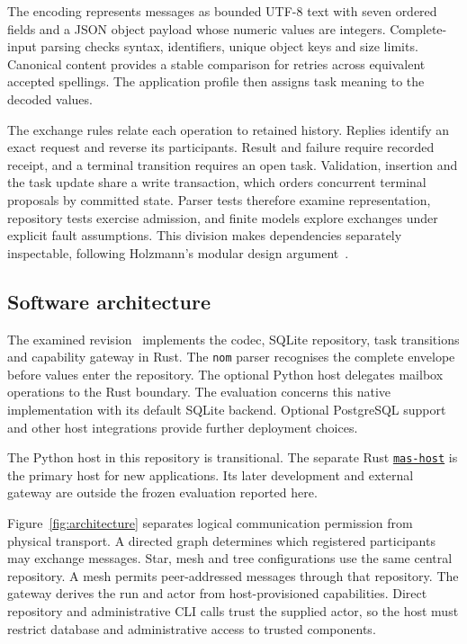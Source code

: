 \documentclass[preprint,12pt,a4paper]{elsarticle}
\newcommand{\code}[1]{\texttt{#1}}
\begin{document}
The encoding represents messages as bounded UTF-8 text with seven ordered fields and a JSON object payload whose numeric values are integers. Complete-input parsing checks syntax, identifiers, unique object keys and size limits. Canonical content provides a stable comparison for retries across equivalent accepted spellings. The application profile then assigns task meaning to the decoded values.

The exchange rules relate each operation to retained history. Replies identify an exact request and reverse its participants. Result and failure require recorded receipt, and a terminal transition requires an open task. Validation, insertion and the task update share a write transaction, which orders concurrent terminal proposals by committed state. Parser tests therefore examine representation, repository tests exercise admission, and finite models explore exchanges under explicit fault assumptions. This division makes dependencies separately inspectable, following Holzmann's modular design argument~\citep[Section~2.7, pp.~36--37]{holzmann1991}.

\subsection{Software architecture}
The examined revision~\citep{masSoftware} implements the codec, SQLite repository, task transitions and capability gateway in Rust. The \code{nom} parser recognises the complete envelope before values enter the repository. The optional Python host delegates mailbox operations to the Rust boundary. The evaluation concerns this native implementation with its default SQLite backend. Optional PostgreSQL support and other host integrations provide further deployment choices.

The Python host in this repository is transitional. The separate Rust \href{https://github.com/emmett08/mas-host}{\code{mas-host}} is the primary host for new applications. Its later development and external gateway are outside the frozen evaluation reported here.

Figure~\ref{fig:architecture} separates logical communication permission from physical transport. A directed graph determines which registered participants may exchange messages. Star, mesh and tree configurations use the same central repository. A mesh permits peer-addressed messages through that repository. The gateway derives the run and actor from host-provisioned capabilities. Direct repository and administrative CLI calls trust the supplied actor, so the host must restrict database and administrative access to trusted components.
\end{document}

